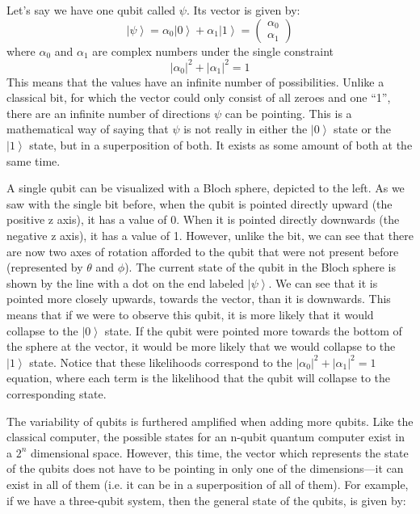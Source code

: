 \documentclass[11pt]{article}
\begin{document}
Let’s say we have one qubit called $\psi$. Its vector is given by:
$$ \left | \psi \right \rangle=\alpha _{0}\left | 0 \right \rangle+\alpha _{1}\left | 1 \right \rangle=\begin{pmatrix}\alpha_{0}\\ \alpha_{1}\end{pmatrix}$$
where $\alpha _{0}$ and $\alpha_{1}$ are complex numbers under the single constraint 
$$ \left | \alpha_{0} \right |^{2} + \left | \alpha_{1} \right |^{2}=1$$
This means that the  values have an infinite number of possibilities. Unlike a classical bit, for which the vector could only consist of all zeroes and one “1”, there are an infinite number of directions $\psi$ can be pointing. This is a mathematical way of saying that $\psi$ is not really in either the $\left | 0 \right \rangle$ state or the $\left | 1 \right \rangle$ state, but in a superposition of both. It exists as some amount of both at the same time. 

\begin{figure}
    \begin{center}
    \def\svgwidth{2in}
    
    \end{center}
\end{figure}

A single qubit can be visualized with a Bloch sphere, depicted to the left. As we saw with the single bit before, when the qubit is pointed directly upward (the positive z axis), it has a value of 0. When it is pointed directly downwards (the negative z axis), it has a value of 1. However, unlike the bit, we can see that there are now two axes of rotation afforded to the qubit that were not present before (represented by $\theta$ and $\phi$). The current state of the qubit in the Bloch sphere is shown by the line with a dot on the end labeled $\left | \psi \right \rangle$. We can see that it is pointed more closely upwards, towards the  vector, than it is downwards. This means that if we were to observe this qubit, it is more likely that it would collapse to the $\left | 0 \right \rangle$ state. If the qubit were pointed more towards the bottom of the sphere at the  vector, it would be more likely that we would collapse to the $\left | 1 \right \rangle$ state. Notice that these likelihoods correspond to the $ \left | \alpha_{0} \right |^{2} + \left | \alpha_{1} \right |^{2}=1$ equation, where each term is the likelihood that the qubit will collapse to the corresponding state.

The variability of qubits is furthered amplified when adding more qubits. Like the classical computer, the possible states for an n-qubit quantum computer exist in a $2^{n}$ dimensional space. However, this time, the vector which represents the state of the qubits does not have to be pointing in only one of the dimensions—it can exist in all of them (i.e. it can be in a superposition of all of them). For example, if we have a three-qubit system, then the general state of the qubits, is given by:
\end{document}
